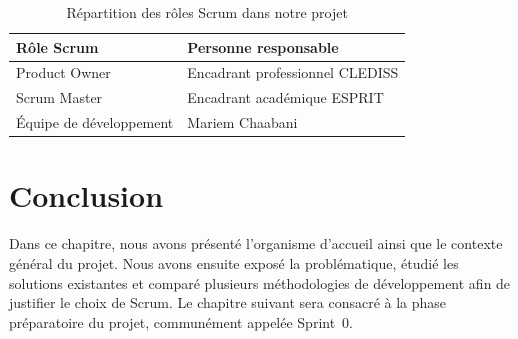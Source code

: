 \begin{table}[H]
\centering
\renewcommand{\arraystretch}{1.4}
\begin{tabular}{|p{5cm}|p{8cm}|}
\hline
\textbf{Rôle Scrum} & \textbf{Personne responsable} \\
\hline
Product Owner & Encadrant professionnel CLEDISS \\
\hline
Scrum Master & Encadrant académique ESPRIT \\
\hline
Équipe de développement & Mariem Chaabani \\
\hline
\end{tabular}
\caption{Répartition des rôles Scrum dans notre projet}
\label{tab:roles-scrum}
\end{table}

\section*{Conclusion}
Dans ce chapitre, nous avons présenté l'organisme d'accueil ainsi que le contexte
général du projet. Nous avons ensuite exposé la problématique, étudié les solutions
existantes et comparé plusieurs méthodologies de développement afin de justifier le
choix de Scrum. Le chapitre suivant sera consacré à la phase préparatoire du projet,
communément appelée Sprint~0.
